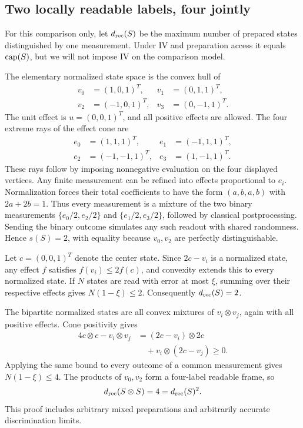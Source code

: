 \subsection{Two locally readable labels, four jointly}
For this comparison only, let $d_{\mathrm{rec}}(S)$ be the maximum number of prepared states distinguished by one measurement. Under IV and preparation access it equals $\operatorname{cap}(S)$, but we will not impose IV on the comparison model.

The elementary normalized state space is the convex hull of
\begin{equation}\label{eq:hs-states}
\begin{aligned}
 v_0&=(1,0,1)^T,&v_1&=(0,1,1)^T,\\
 v_2&=(-1,0,1)^T,&v_3&=(0,-1,1)^T.
\end{aligned}
\end{equation}
The unit effect is $u=(0,0,1)^T$, and all positive effects are allowed. The four extreme rays of the effect cone are
\begin{equation}\label{eq:hs-effects}
\begin{aligned}
 e_0&=(1,1,1)^T,&e_1&=(-1,1,1)^T,\\
 e_2&=(-1,-1,1)^T,&e_3&=(1,-1,1)^T.
\end{aligned}
\end{equation}
These rays follow by imposing nonnegative evaluation on the four displayed vertices. Any finite measurement can be refined into effects proportional to $e_i$. Normalization forces their total coefficients to have the form $(a,b,a,b)$ with $2a+2b=1$. Thus every measurement is a mixture of the two binary measurements $\{e_0/2,e_2/2\}$ and $\{e_1/2,e_3/2\}$, followed by classical postprocessing. Sending the binary outcome simulates any such readout with shared randomness. Hence $s(S)=2$, with equality because $v_0,v_2$ are perfectly distinguishable.

Let $c=(0,0,1)^T$ denote the center state. Since $2c-v_i$ is a normalized state, any effect $f$ satisfies $f(v_i)\leq2f(c)$, and convexity extends this to every normalized state. If $N$ states are read with error at most $\xi$, summing over their respective effects gives $N(1-\xi)\leq2$. Consequently $d_{\mathrm{rec}}(S)=2$.

The bipartite normalized states are all convex mixtures of $v_i\otimes v_j$, again with all positive effects. Cone positivity gives
\begin{equation}\label{eq:hs-cone}
\begin{aligned}
 4c\otimes c-v_i\otimes v_j
 &=(2c-v_i)\otimes2c\\
 &\quad+v_i\otimes(2c-v_j)\geq0.
\end{aligned}
\end{equation}
Applying the same bound to every outcome of a common measurement gives $N(1-\xi)\leq4$. The products of $v_0,v_2$ form a four-label readable frame, so
\begin{equation}\label{eq:hs-readable}
 \drec(S\otimes S)=4=\drec(S)^2.
\end{equation}
This proof includes arbitrary mixed preparations and arbitrarily accurate discrimination limits.

